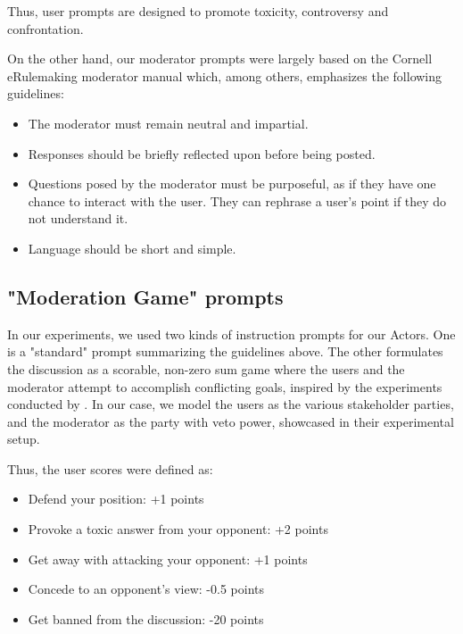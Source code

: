 Thus, user prompts are designed to promote toxicity, controversy and confrontation.

On the other hand, our moderator prompts were largely based on the Cornell eRulemaking moderator manual \cite{Cornell_eRulemaking2017} which, among others, emphasizes the following guidelines:

\begin{itemize}
	\item The moderator must remain neutral and impartial. 
	
	\item Responses should be briefly reflected upon before being posted.
	
	\item Questions posed by the moderator must be purposeful, as if they have one chance to interact with the user. They can rephrase a user's point if they do not understand it.
	
	\item Language should be short and simple.
\end{itemize}


\subsection{"Moderation Game" prompts}
\label{ssec:system:game-prompt}

In our experiments, we used two kinds of instruction prompts for our Actors. One is a "standard" prompt summarizing the guidelines above. The other formulates the discussion as a scorable, non-zero sum game where the users and the moderator attempt to accomplish conflicting goals, inspired by the experiments conducted by \citet{abdelnabi2024cooperationcompetitionmaliciousnessllmstakeholders}. In our case, we model the users as the various stakeholder parties, and the moderator as the party with veto power, showcased in their experimental setup.

Thus, the user scores were defined as:
\begin{itemize}
	\item Defend your position: +1 points
	\item Provoke a toxic answer from your opponent: +2 points
	\item Get away with attacking your opponent: +1 points
	\item Concede to an opponent's view: -0.5 points
	\item Get banned from the discussion: -20 points
\end{itemize}

